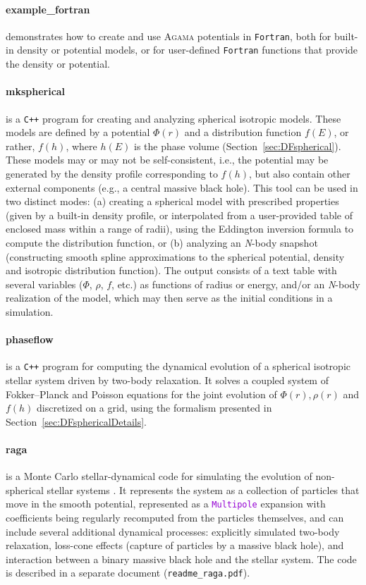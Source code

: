 \documentclass[12pt]{article}
\newcommand{\Agama}{\textsc{Agama}\xspace}
\newcommand{\Nbody}{\textsl{N}-body\xspace}
\newcommand{\Cpp}  {\texttt{C++}\xspace}
\newcommand{\Fortran}{\texttt{Fortran}\xspace}
\newcommand{\ttt}[1]{\textcolor{darkviolet}{\texttt{#1}}}
\begin{document}
\paragraph{example_fortran} demonstrates how to create and use \Agama potentials in \Fortran, both for built-in density or potential models, or for user-defined \Fortran functions that provide the density or potential.

\paragraph{mkspherical} is a \Cpp program for creating and analyzing spherical isotropic models. These models are defined by a potential $\Phi(r)$ and a distribution function $f(E)$, or rather, $f(h)$, where $h(E)$ is the phase volume (Section~\ref{sec:DFspherical}). These models may or may not be self-consistent, i.e., the potential may be generated by the density profile corresponding to $f(h)$, but also contain other external components (e.g., a central massive black hole). This tool can be used in two distinct modes: (a) creating a spherical model with prescribed properties (given by a built-in density profile, or interpolated from a user-provided table of enclosed mass within a range of radii), using the Eddington inversion formula to compute the distribution function, or (b) analyzing an \Nbody snapshot (constructing smooth spline approximations to the spherical potential, density and isotropic distribution function). The output consists of a text table with several variables ($\Phi$, $\rho$, $f$, etc.) as functions of radius or energy, and/or an \Nbody realization of the model, which may then serve as the initial conditions in a simulation.

\paragraph{phaseflow} is a \Cpp program for computing the dynamical evolution of a spherical isotropic stellar system driven by two-body relaxation. It solves a coupled system of Fokker--Planck and Poisson equations for the joint evolution of $\Phi(r), \rho(r)$ and $f(h)$ discretized on a grid, using the formalism presented in Section~\ref{sec:DFsphericalDetails}.

\paragraph{raga} is a Monte Carlo stellar-dynamical code for simulating the evolution of non-spherical stellar systems \cite{Vasiliev2015}. It represents the system as a collection of particles that move in the smooth potential, represented as a \ttt{Multipole} expansion with coefficients being regularly recomputed from the particles themselves, and can include several additional dynamical processes: explicitly simulated two-body relaxation, loss-cone effects (capture of particles by a massive black hole), and interaction between a binary massive black hole and the stellar system. The code is described in a separate document (\texttt{readme_raga.pdf}).
\end{document}
